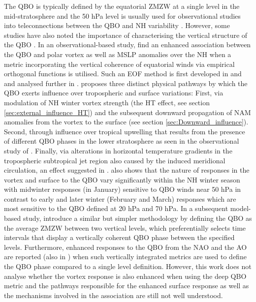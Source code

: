 The QBO is typically defined by the equatorial ZMZW at a single level in the mid-stratosphere and the 50 hPa level is usually used for observational studies into teleconnections between the QBO and NH variability \citep{baldwinQuasiBiennial2001}. However, some studies have also noted the importance of characterising the vertical structure of the QBO \citep{fraedrichEOF1993, wallaceRepresentation1993,  Baldwin98,  Dunkerton2017, graySurface2018b, andrewsObserved2019d}. In an observational-based study, \cite{graySurface2018b} find an enhanced association between the QBO and polar vortex as well as MSLP anomalies over the NH when a metric incorporating the vertical coherence of equatorial winds via empirical orthogonal functions is utilised. Such an EOF method is first developed in \cite{fraedrichEOF1993} and \cite{wallaceRepresentation1993} and analysed further in \cite{verena2016a}. \cite{graySurface2018b} proposes three distinct physical pathways by which the QBO exerts influence over tropospheric and surface variations: First, via modulation of NH winter vortex strength (the HT effect, see section \ref{sec:external_influence_HT}) and the subsequent downward propagation of NAM anomalies from the vortex to the surface (see section \ref{sec:Downward_influence}). Second, through influence over tropical upwelling that results from the presence of different QBO phases in the lower stratosphere as seen in the observational study of \cite{liessRelationship2012}. Finally, via alterations in horizontal temperature gradients in the tropospheric subtropical jet region also caused by the induced meridional circulation, an effect suggested in \cite{garfinkelInfluence2011}. \cite{graySurface2018b} also shows that the nature of responses in the vortex and surface to the QBO vary significantly within the NH winter season with midwinter responses (in January) sensitive to QBO winds near 50 hPa in contrast to early and later winter (February and March) responses which are most sensitive to the QBO defined at 20 hPa and 70 hPa. In a subsequent model-based study, \cite{andrewsObserved2019d} introduce a similar but simpler methodology by defining the QBO as the average ZMZW between two vertical levels, which preferentially selects time intervals that display a vertically coherent QBO phase between the specified levels. Furthermore, enhanced responses to the QBO from the NAO and the AO are reported (also in \cite{andrewsObserved2019d}) when such vertically integrated metrics are used to define the QBO phase compared to a single level definition. However, this work does not analyse whether the vortex response is also enhanced when using the deep QBO metric and the pathways responsible for the enhanced surface response as well as the mechanisms involved in the association are still not well understood. 

